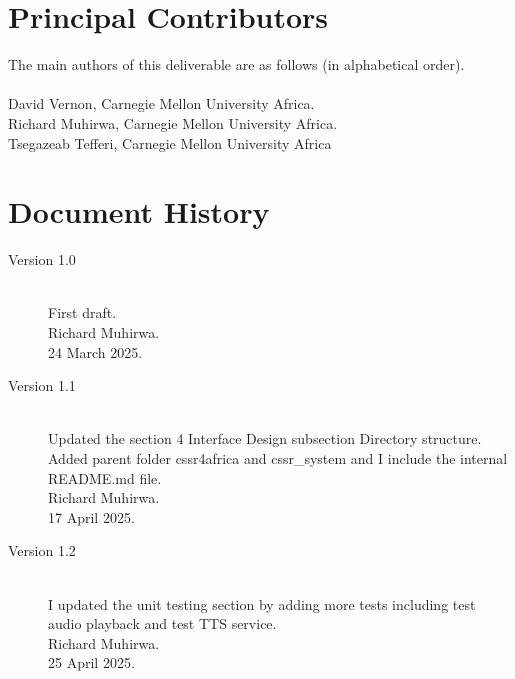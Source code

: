 \documentclass{CSSRforAfrica}
\newcommand{\blank}{~\\}
\begin{document}
\newpage




\pagebreak
\section*{Principal Contributors}
\label{contributors}
The main authors of this deliverable are as follows (in alphabetical order).
\blank
~
\blank
David Vernon,  Carnegie Mellon University Africa.\\    %
Richard Muhirwa,  Carnegie Mellon University Africa.\\    %
Tsegazeab Tefferi,  Carnegie Mellon University Africa                                                                              %


\newpage
\section*{Document History}
\label{document_history}

\begin{description}

\item [Version 1.0]~\\
First draft. \\
Richard  Muhirwa. \\         
24 March 2025.                  

\item [Version 1.1]~\\
Updated the section 4 Interface Design subsection Directory structure. Added parent folder cssr4africa and cssr\_system and I include the internal README.md file.\\
Richard  Muhirwa. \\  
17 April 2025.

\item [Version 1.2]~\\
I updated the unit testing section by adding more tests including test audio playback and test TTS service. \\
Richard  Muhirwa. \\          
25 April 2025.

\end{description}
\end{document}
